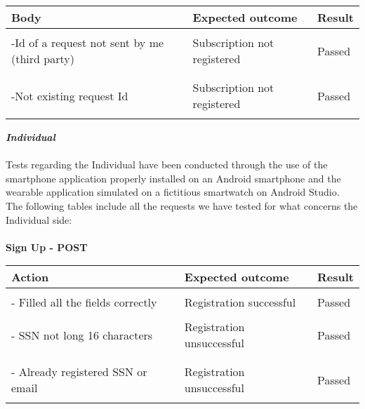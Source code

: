 \begin{center}
	\begin{tabular}{|p{}|p{}|p{}|}
		\hline
		Body & Expected outcome & Result \\
		\hline
		&&\\
		-Id of a request not sent by me (third party)&Subscription not registered&Passed\\
		&&\\
		\hline
		&&\\
		-Not existing request Id &Subscription not registered&Passed\\
		&&\\
		\hline
	\end{tabular}
\end{center}

\textbf{\textit{Individual}}\\\\
Tests regarding the Individual have been conducted through the use of the smartphone application properly installed on an Android smartphone and the wearable application simulated on a fictitious smartwatch on Android Studio.\\ 
The following tables include all the requests we have tested for what concerns the Individual side:\\\\

\textbf{Sign Up - POST}
\begin{center}
	\begin{tabular}{|p{}|p{}|p{}|}
		\hline
		Action & Expected outcome & Result \\
		\hline
		&&\\
		- Filled all the fields correctly&Registration successful&Passed\\
		\hline
		&&\\
		- SSN not long 16 characters&Registration unsuccessful&Passed\\
		&&\\
		\hline
		&&\\
		- Already registered SSN or email&Registration unsuccessful&Passed\\
		&&\\
		\hline
	\end{tabular}
\end{center}

